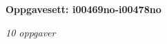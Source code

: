 \centerline{\bf Oppgavesett: i00469no-i00478no}
\vskip 10pt
\centerline{\it 10 oppgaver}\vskip 10pt
\vskip 10pt
